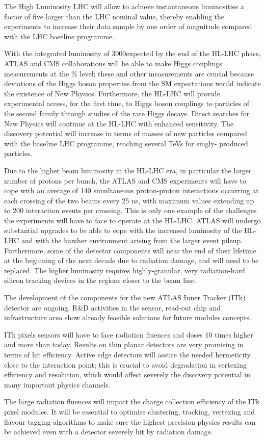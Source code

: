 The High Luminosity LHC will allow to achieve instantaneous luminosities a factor of five larger than the 
LHC nominal value, thereby enabling the experiments to increase their data sample by one order of 
magnitude compared with the LHC baseline programme.

With the integrated luminosity of 3000\invfb expected by the end of the HL-LHC phase, ATLAS and CMS 
collaborations will be able to make Higgs couplings measurements at the \% level; 
these and other measurements are crucial because deviations of the Higgs boson properties from the SM 
expectations would indicate the existence of New Physics. 
Furthermore, the HL-LHC will provide experimental access, for the first time, to Higgs boson couplings to particles of the second family through studies of the rare Higgs decays.
Direct searches for New Physics will continue at 
the HL-LHC with enhanced sensitivity. The discovery potential will increase  in terms of 
masses of new particles compared with the baseline LHC programme, reaching several TeVs for singly-
produced particles.

Due to the higher beam luminosity in the HL-LHC era, in particular the larger number of protons per bunch, 
the ATLAS and CMS experiments will have to cope with an average of 140 simultaneous proton-proton 
interactions occurring at each crossing of the two beams every 25 ns, with maximum 
values extending up to 200 interaction events per crossing. This is only one example of the challenges the 
experiments will have to face to operate at the HL-LHC.
 ATLAS  will undergo substantial upgrades to be able to cope with the increased luminosity of the HL-LHC 
and with the harsher environment arising from the larger event pileup. Furthermore, some of the detector 
components will near the end of their lifetime at the beginning of the next decade due to radiation damage, 
and will need to be replaced. The higher luminosity  requires highly-granular, very radiation-hard silicon 
tracking devices in the regions closer to the beam line.


The development of the components for the new ATLAS Inner Tracker (ITk) detector are ongoing.
 R\&D activities in the sensor, read-out chip and infrastructure area show already feasible solutions for 
 future modules concepts.

ITk pixels sensors will have to face radiation fluences and doses 10 times higher and more than today. 
Results on thin planar detectors are very promising in terms of hit efficiency. Active edge detectors 
will assure the needed hermeticity close to the interaction point; this is crucial to avoid 
degradation in vertexing efficiency and resolution, which would affect severely the  
discovery potential in many important physics channels.

The large radiation fluences will impact the charge collection efficiency of the ITk pixel modules. 
It will be essential to optimise clustering, tracking, vertexing and flavour tagging algorithms to 
make sure the highest precision physics results can be achieved even with a detector severely hit 
by radiation damage. 

